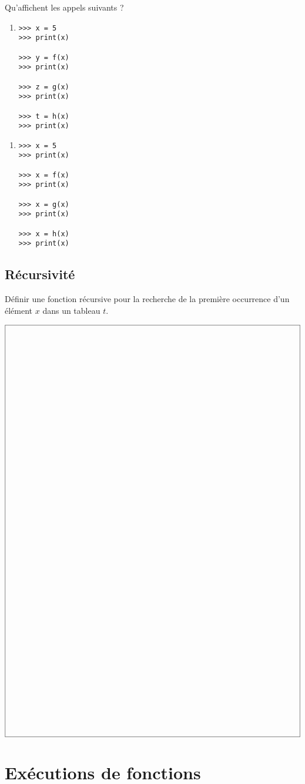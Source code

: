 \documentclass[11pt,a4paper]{article}
\begin{document}
Qu'affichent les appels suivants ?
\vspace*{2mm}

\begin{minipage}{7cm}
\begin{enumerate}
\item 

\begin{py}{3cm}
\begin{verbatim}
>>> x = 5
>>> print(x)

>>> y = f(x)
>>> print(x)

>>> z = g(x)
>>> print(x)

>>> t = h(x)
>>> print(x)
\end{verbatim}
\end{py}

\framebox[5.5cm]{$\rule{0cm}{12cm}$}
\end{enumerate}
\end{minipage}
\hfill
\begin{minipage}{7cm}
\begin{enumerate}

\item

\begin{py}{4cm}
\begin{verbatim}
>>> x = 5
>>> print(x)

>>> x = f(x)
>>> print(x)

>>> x = g(x)
>>> print(x)

>>> x = h(x)
>>> print(x)
\end{verbatim}
\end{py}

\framebox[5.5cm]{$\rule{0cm}{12cm}$}

\end{enumerate}
\end{minipage}

\subsection{Récursivité}
Définir une fonction récursive pour la recherche de la première occurrence
d'un élément $x$ dans un tableau $t$.

$$\framebox[14.5cm]{$\rule{0cm}{20cm}$}$$

\section{Exécutions de fonctions}
\end{document}

